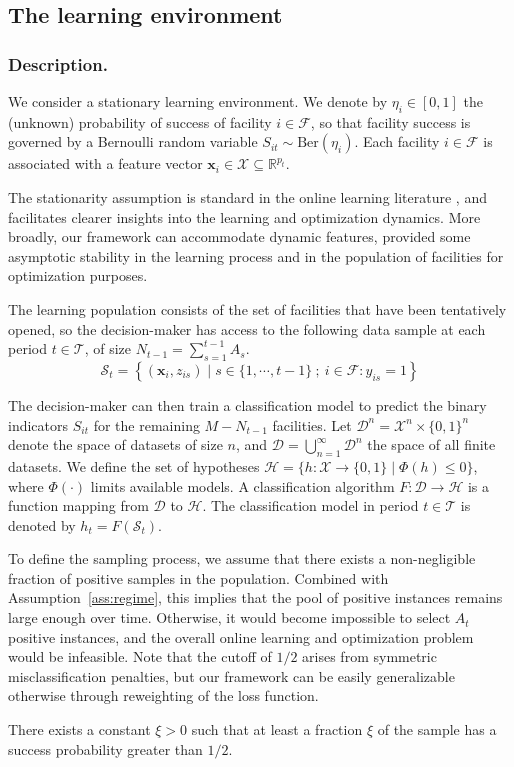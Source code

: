 \documentclass[nonblindrev]{informs3noheader}
\def\R{\mathbb{R}}
\def\calD{\mathcal{D}}
\def\calF{\mathcal{F}}
\def\calH{\mathcal{H}}
\def\calS{\mathcal{S}}
\def\calT{\mathcal{T}}
\def\calX{\mathcal{X}}
\def\bx{\boldsymbol{x}}
\begin{document}
\subsection{The learning environment}
\label{subsec:learning}

\subsubsection*{Description.}
We consider a stationary learning environment. We denote by $\eta_{i} \in [0,1]$ the (unknown) probability of success of facility $i\in\calF$, so that facility success is governed by a Bernoulli random variable $S_{it}\sim \text{Ber}(\eta_{i})$. Each facility $i\in\calF$ is associated with a feature vector $\bx_{i} \in \calX\subseteq\R^{p_t}$.

The stationarity assumption is standard in the online learning literature \citep[e.g.,][]{auer2002using, agrawal2012analysis}, and facilitates clearer insights into the learning and optimization dynamics. More broadly, our framework can accommodate dynamic features, provided some asymptotic stability in the learning process and in the population of facilities for optimization purposes.

The learning population consists of the set of facilities that have been tentatively opened, so the decision-maker has access to the following data sample at each period $t\in\calT$, of size $N_{t-1}=\sum_{s=1}^{t-1}A_s$.
$$\calS_t=\left\{(\bx_{i},z_{is})\mid s\in\{1,\cdots,t-1\}\ ;\ i\in\calF:y_{is}=1\right\}$$

The decision-maker can then train a classification model to predict the binary indicators $S_{it}$ for the remaining $M-N_{t-1}$ facilities. Let $\calD^n = \calX^n\times\{0,1\}^n$ denote the space of datasets of size $n$, and $\calD = \bigcup_{n=1}^\infty \calD^n$ the space of all finite datasets. We define the set of hypotheses $\calH = \{h: \calX \to \{0,1\} \mid \Phi(h) \leq 0\}$, where $\Phi(\cdot)$ limits available models. A classification algorithm $F: \calD \to \mathcal{H}$ is a function mapping from $ \calD$ to $\calH$. The classification model in period $t\in\calT$ is denoted by $h_t = F(\mathcal{S}_t)$.

To define the sampling process, we assume that there exists a non-negligible fraction of positive samples in the population. Combined with Assumption~\ref{ass:regime}, this implies that the pool of positive instances remains large enough over time. Otherwise, it would become impossible to select $A_t$ positive instances, and the overall online learning and optimization problem would be infeasible. Note that the cutoff of $1/2$ arises from symmetric misclassification penalties, but our framework can be easily generalizable otherwise through reweighting of the loss function.
\begin{assumption}\label{ass:positive} There exists a constant $\xi > 0$ such that at least a fraction $\xi$ of the sample has a success probability greater than $1/2$.
\end{assumption}
\end{document}
